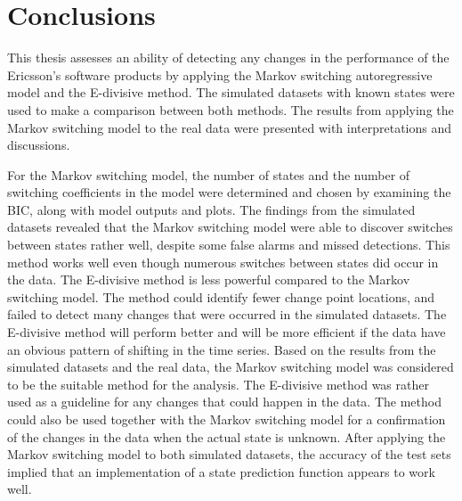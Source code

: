 
\lhead[\chaptername~\thechapter]{\rightmark}

\rhead[\leftmark]{}

\lfoot[\thepage]{}

\cfoot{}

\rfoot[]{\thepage}

\chapter{Conclusions }

This thesis assesses an ability of detecting any changes in the performance
of the Ericsson's software products by applying the Markov switching
autoregressive model and the E-divisive method. The simulated datasets
with known states were used to make a comparison between both methods.
The results from applying the Markov switching model to the real data
were presented with interpretations and discussions. 

For the Markov switching model, the number of states and the number
of switching coefficients in the model were determined and chosen
by examining the BIC, along with model outputs and plots. The findings
from the simulated datasets revealed that the Markov switching model
were able to discover switches between states rather well, despite
some false alarms and missed detections. This method works well even
though numerous switches between states did occur in the data. The
E-divisive method is less powerful compared to the Markov switching
model. The method could identify fewer change point locations, and
failed to detect many changes that were occurred in the simulated
datasets. The E-divisive method will perform better and will be more
efficient if the data have an obvious pattern of shifting in the time
series. Based on the results from the simulated datasets and the real
data, the Markov switching model was considered to be the suitable
method for the analysis. The E-divisive method was rather used as
a guideline for any changes that could happen in the data. The method
could also be used together with the Markov switching model for a
confirmation of the changes in the data when the actual state is unknown.
After applying the Markov switching model to both simulated datasets,
the accuracy of the test sets implied that an implementation of a
state prediction function appears to work well. %
\begin{comment}
Moreover, an implementation of a state prediction function appears
to functionally work well when investigating on the simulated datasets.
The accuracy from both simulated datasets were high. 
\end{comment}

